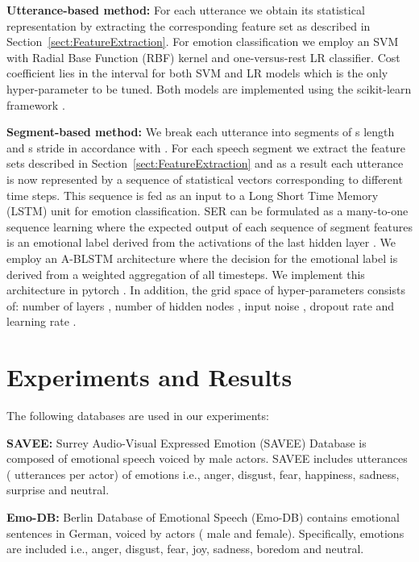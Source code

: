 \documentclass[a4paper]{article}
\begin{document}
\noindent\textbf{Utterance-based method:} For each utterance we obtain its statistical representation by extracting the corresponding feature set as described in Section~\ref{sect:FeatureExtraction}. For emotion classification we employ an SVM with Radial Base Function (RBF) kernel and one-versus-rest LR classifier. Cost coefficient  lies in the interval  for both SVM and LR models which is the only hyper-parameter to be tuned. Both models are implemented using the scikit-learn framework \cite{scikit-learn}. \vspace*{1mm}

\noindent\textbf{Segment-based method:} We break each utterance into segments of  s length and  s stride in accordance with \cite{tzinis2017segment}. For each speech segment we extract the feature sets described in Section~\ref{sect:FeatureExtraction} and as a result each utterance is now represented by a sequence of statistical vectors corresponding to different time steps. This sequence is fed as an input to a Long Short Time Memory (LSTM) unit for  emotion classification. SER can be formulated as a many-to-one sequence learning where the expected output of each sequence of segment features is an emotional label derived from the activations of the last hidden layer \cite{shri2016attention}. We employ an A-BLSTM architecture \cite{mirsamadi2017attention} where the decision for the emotional label is derived from a weighted aggregation of all timesteps. We implement this architecture in pytorch \cite{pytorch}. In addition, the grid space of hyper-parameters consists of: number of layers , number of hidden nodes , input noise , dropout rate  and learning rate .    




\section{Experiments and Results}

The following databases are used in our experiments: \vspace*{1mm}

\noindent\textbf{SAVEE:} Surrey Audio-Visual Expressed Emotion (SAVEE) Database \cite{SAVEE} is composed of emotional speech voiced by  male actors. SAVEE includes  utterances ( utterances per actor) of  emotions i.e.,  anger,  disgust,  fear,  happiness,  sadness,  surprise and  neutral.\vspace*{1mm}

\noindent\textbf{Emo-DB:} Berlin Database of Emotional Speech (Emo-DB) \cite{EmoDB} contains  emotional sentences in German, voiced by  actors ( male and  female). Specifically,  emotions are included i.e.,  anger,  disgust,  fear,  joy,  sadness,  boredom and  neutral.\vspace*{1mm}
\end{document}
